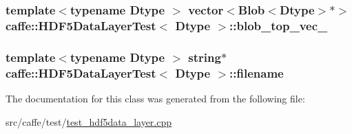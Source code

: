 \hypertarget{classcaffe_1_1_h_d_f5_data_layer_test_add8fb70dc419407a8e0ca8a78640c380}{
\subsubsection[{blob\+\_\+top\+\_\+vec\+\_\+}]{\setlength{\rightskip}{0pt plus 5cm}template$<$typename Dtype $>$ vector$<${\bf Blob}$<$Dtype$>$$\ast$$>$ {\bf caffe\+::\+H\+D\+F5\+Data\+Layer\+Test}$<$ Dtype $>$\+::blob\+\_\+top\+\_\+vec\+\_\+\hspace{0.3cm}{\ttfamily [protected]}}}\label{classcaffe_1_1_h_d_f5_data_layer_test_add8fb70dc419407a8e0ca8a78640c380}
\hypertarget{classcaffe_1_1_h_d_f5_data_layer_test_a7f63b15d92f052d045c969e74ad8ed5d}{
\subsubsection[{filename}]{\setlength{\rightskip}{0pt plus 5cm}template$<$typename Dtype $>$ string$\ast$ {\bf caffe\+::\+H\+D\+F5\+Data\+Layer\+Test}$<$ Dtype $>$\+::filename\hspace{0.3cm}{\ttfamily [protected]}}}\label{classcaffe_1_1_h_d_f5_data_layer_test_a7f63b15d92f052d045c969e74ad8ed5d}


The documentation for this class was generated from the following file\+:\begin{DoxyCompactItemize}
\item 
src/caffe/test/\hyperlink{test__hdf5data__layer_8cpp}{test\+\_\+hdf5data\+\_\+layer.\+cpp}\end{DoxyCompactItemize}
